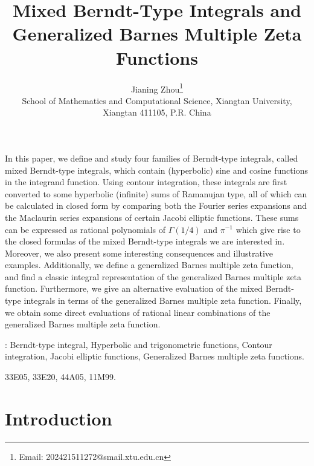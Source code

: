 \documentclass[11pt]{article}
\let\oldsection\section
\renewcommand\section{\setcounter{equation}{0}\oldsection}
\theoremstyle{plain}
\theoremstyle{definition}
\begin{document}
\title{\bf Mixed Berndt-Type Integrals and Generalized Barnes Multiple Zeta Functions}
\author{
		{ Jianing Zhou\thanks{Email: 202421511272@smail.xtu.edu.cn}}\\[1mm]
		\small School of
		Mathematics and Computational Science, Xiangtan University, \\ \small Xiangtan 411105,  P.R. China}
	
\date{}
\maketitle
	
 In this paper, we define and study four families of Berndt-type integrals, called mixed Berndt-type integrals, which contain (hyperbolic) sine and cosine functions in the integrand function.  Using contour integration, these integrals are first converted to some hyperbolic (infinite) sums of Ramanujan type, all of which can be calculated in closed form by  comparing both the Fourier series expansions and the Maclaurin series expansions of certain Jacobi elliptic functions. These sums can be expressed as rational polynomials of $\Gamma(1/4)$ and $\pi^{-1}$ which give rise to the closed formulas of the mixed Berndt-type integrals we are interested in. Moreover, we also present some interesting consequences and illustrative examples. Additionally, we define a generalized Barnes multiple zeta function, and find a classic integral representation of the generalized Barnes multiple zeta function. Furthermore, we give an alternative evaluation of the mixed Berndt-type integrals in terms of the generalized Barnes multiple zeta function. Finally, we obtain some direct evaluations of rational linear combinations of the generalized Barnes multiple zeta function.

	
\medskip
{}: Berndt-type integral, Hyperbolic and trigonometric functions, Contour integration, Jacobi elliptic functions, Generalized Barnes multiple zeta functions.
	
	
	  33E05, 33E20, 44A05, 11M99.
	\tableofcontents
\section{Introduction}
\end{document}
